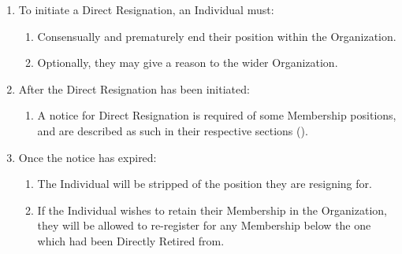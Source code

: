 \begin{enumerate}
	\item To initiate a Direct Resignation, an Individual must:
		\begin{enumerate}
			\item Consensually and prematurely end their position within the Organization.

			\item Optionally, they may give a reason to the wider Organization.
		\end{enumerate}

	\item After the Direct Resignation has been initiated:
		\begin{enumerate}
			\item A notice for Direct Resignation is required of some Membership positions,
				and are described as such in their respective sections ().
		\end{enumerate}

	\item Once the notice has expired:
		\begin{enumerate}
			\item The Individual will be stripped of the position they are resigning for.

			\item If the Individual wishes to retain their Membership in the Organization,
				they will be allowed to re-register for any Membership below the one
				which had been Directly Retired from.
		\end{enumerate}
\end{enumerate}

